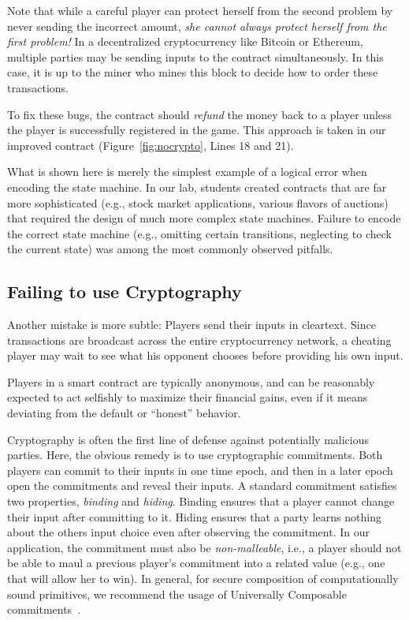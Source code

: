 \documentclass{llncs}
\newcommand{\elaine}[1]{}
\begin{document}
Note that while a careful player 
can protect herself from the second problem by never sending the incorrect amount,
{\it she cannot always protect 
herself from the first problem!}
In a decentralized cryptocurrency
like Bitcoin or Ethereum, 
multiple parties may be sending inputs 
to the contract simultaneously.
In this case, it is up to the miner who mines this block
to decide how to order these transactions.

To fix these bugs, the contract
should \emph{refund} the money back to
a player unless the player is successfully registered in the game.
This approach is taken in our improved contract (Figure~\ref{fig:nocrypto}, Lines 18 and 21).


What is shown here is merely the simplest example 
of a logical error when encoding the state machine.
In our lab, students created contracts that are far more
sophisticated (e.g., stock market 
applications, various flavors of auctions)
that required the design of much more 
complex state machines.
Failure to encode the correct state machine (e.g., 
omitting certain transitions, neglecting
to check the current state)  
was among the most commonly observed pitfalls. 


\subsection{Failing to use Cryptography}
Another mistake is more subtle:
Players
send their inputs in cleartext. Since transactions are broadcast across the entire cryptocurrency network, a cheating player may wait to see what his opponent chooses before providing his own input.

Players in a smart contract are typically anonymous, and can be reasonably expected to act selfishly to maximize their financial gains, even if it means deviating from the default or ``honest'' behavior.

Cryptography is often the first line of defense against potentially malicious parties. 
Here, the obvious remedy is to use
cryptographic commitments.
Both players can commit to their inputs in one time epoch,
and then in a later epoch open the commitments and reveal their inputs.
A standard commitment satisfies two properties, {\it binding} and {\it hiding}.
Binding ensures that a player cannot change their input
after committing to it. Hiding ensures
that a party learns nothing about the others input choice even after observing the commitment.
In our application, the commitment must also be {\it non-malleable}, i.e.,  
a player should not be able to maul a previous player's commitment into  
a related value (e.g., one that will allow her to win). 
In general, for secure composition of computationally sound primitives, 
we recommend the usage of Universally Composable commitments~\cite{uc,guc,juc}. 
\end{document}
